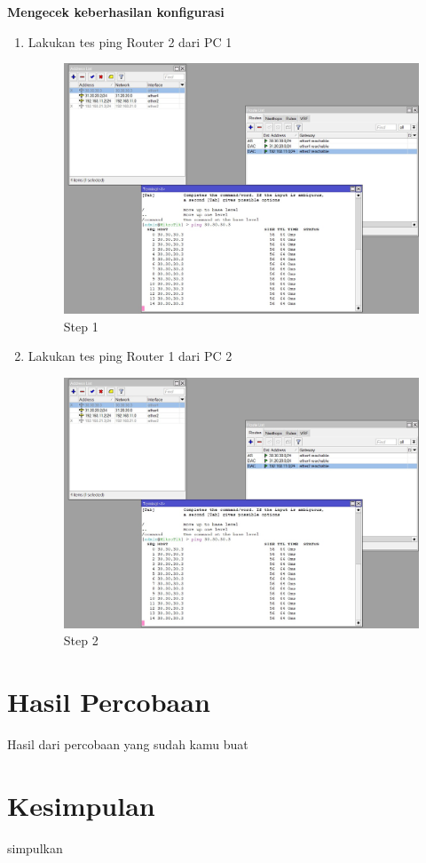 \begin{center} 
	\textbf{Mengecek keberhasilan konfigurasi}
\end{center}

\begin{enumerate}
	\item Lakukan tes ping Router 2 dari PC 1
	\begin{figure}[H]
		\centering
		\includegraphics[width=0.5\linewidth]{P2/img/statis_ping.jpg}
		\caption{Step 1}
		\label{fig:gambar14}
	\end{figure}

	\item Lakukan tes ping Router 1 dari PC 2
	\begin{figure}[H]
		\centering
		\includegraphics[width=0.5\linewidth]{P2/img/statis_ping.jpg}
		\caption{Step 2}
		\label{fig:gambar15}
	\end{figure}

\end{enumerate}

\section{Hasil Percobaan}
Hasil dari percobaan yang sudah kamu buat

\section{Kesimpulan}
simpulkan

